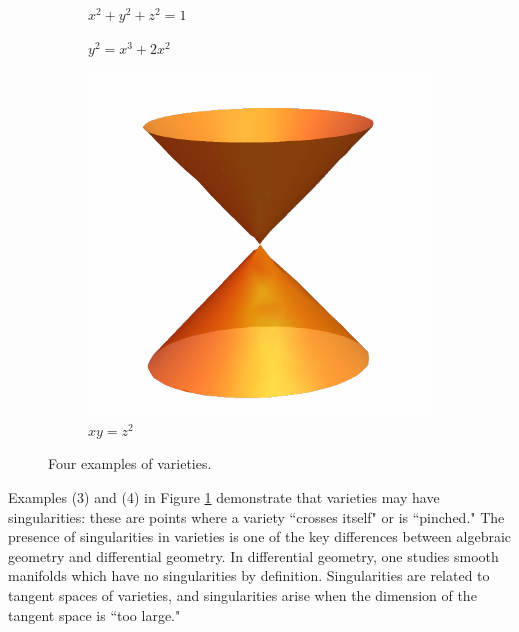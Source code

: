 \documentclass[12pt]{amsart}
\theoremstyle{plain}
\theoremstyle{definition}
\begin{document}
\begin{figure}[H]
\begin{subfigure}[t]{0.23\textwidth}
	\vspace{-1.5cm}
        \caption{$x^2 + y^2 + z^2 = 1$}
    \end{subfigure}
    \hfill
    \begin{subfigure}[t]{0.23\textwidth}
        \centering
        \vspace{-0cm} %
	 \vspace{0.1cm}
        \caption{$y^2 = x^3 + 2x^2$}
    \end{subfigure}
    \hfill
    \begin{subfigure}[t]{0.23\textwidth}
        \centering
        \vspace{-0.5cm} %
        \includegraphics[width=0.8 \linewidth]{../images/orange_cone}
        \vspace{-0.2cm} %
        \caption{$xy = z^2$}
    \end{subfigure}
    \caption{Four examples of varieties.}
	\label{figure:fourvarieties}
\end{figure}

Examples (3) and (4) in Figure \ref{figure:fourvarieties} demonstrate that varieties may have singularities: these are points where a variety ``crosses itself" or is ``pinched."
The presence of singularities in varieties is one of the key differences between algebraic geometry and differential geometry.
In differential geometry, one studies smooth manifolds which have no singularities by definition.
Singularities are related to tangent spaces of varieties, and singularities arise when the dimension of the tangent space is ``too large."
\end{document}
